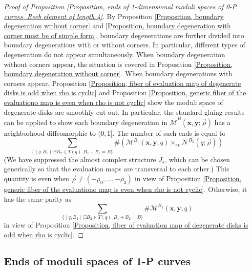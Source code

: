 \documentclass{amsart}
\theoremstyle{definition}
\theoremstyle{remark}
\numberwithin{equation}{section}
\numberwithin{equation}{section} \makeatletter
\begin{document}
\begin{proof}[Proof of Proposition \ref{Proposition, ends of 1-dimensional moduli spaces of 0-P curves, Reeb element of length 4}]
By Proposition \ref{Proposition, boundary degeneration without corner} and \ref{Proposition, boundary degeneration with corner must be of simple form}, boundary degenerations are further divided into boundary degenerations with or without corners. In particular, different types of degeneration do not appear simultaneously. When boundary degeneration without corners appear, the situation is covered in Proposition \ref{Proposition, boundary degeneration without corner}. When boundary degenerations with corners appear, Proposition \ref{Proposition, fiber of evaluation map of degenerate disks is odd when rho is cyclic} and Proposition \ref{Proposition, generic fiber of the evaluationo map is even when rho is not cyclic} show the moduli space of degenerate disks are smoothly cut out. In particular, the standard gluing results can be applied to show each boundary degeneration in $\overline{\mathcal{M}}^B(\bm{x},\bm{y};\overrightarrow{\rho})$ has a neighborhood diffeomorphic to $(0,1]$. The number of such ends is equal to $$\sum_{\{(q,B_1)|\exists B_2\in T(q),B_1+B_2=B\}}\#(\mathcal{M}^{B_1}(\bm{x},\bm{y};q)\times_{ev}\mathcal{N}^{B_2}(q;\overrightarrow{\rho}))$$ (We have suppressed the almost complex structure $J_s$, which can be chosen generically so that the evaluation maps are transversal to each other.) This quantity is even when $\overrightarrow{\rho}\neq (-\rho_0,\ldots,-\rho_3)$ in view of Proposition \ref{Proposition, generic fiber of the evaluationo map is even when rho is not cyclic}. Otherwise, it has the same parity as $$\sum_{\{(q,B_1)|\exists B_2\in T(q),B_1+B_2=B\}}\#\mathcal{M}^{B_1}(\bm{x},\bm{y};q)$$ in view of Proposition \ref{Proposition, fiber of evaluation map of degenerate disks is odd when rho is cyclic}.
\end{proof}

\subsection{Ends of moduli spaces of 1-P curves}\label{Subsection, ends of moduli space of 1P curves}
\end{document}
